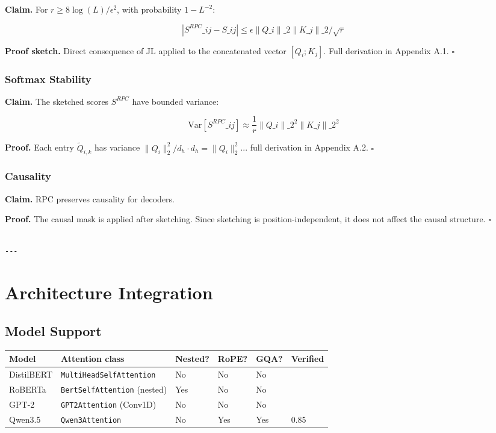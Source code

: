 \textbf{Claim.} For $r \geq 8 \log(L) / \epsilon^2$, with probability $1 - L^{-2}$:

\[
|S^{RPC}\_{ij} - S\_{ij}| \leq \epsilon \|Q\_i\|\_2 \|K\_j\|\_2 / \sqrt{r}
\tag{4.7}
\]

\textbf{Proof sketch.} Direct consequence of JL applied to the concatenated 
vector $[Q_i; K_j]$. Full derivation in Appendix A.1. $\square$

\subsubsection{Softmax Stability}

\textbf{Claim.} The sketched scores $S^{RPC}$ have bounded variance:

\[
\text{Var}[S^{RPC}\_{ij}] \approx \frac{1}{r} \|Q\_i\|\_2^2 \|K\_j\|\_2^2
\tag{4.8}
\]

\textbf{Proof.} Each entry $\tilde{Q}_{i,k}$ has variance $\|Q_i\|_2^2 / d_h \cdot d_h = \|Q_i\|_2^2$... 
full derivation in Appendix A.2. $\square$

\subsubsection{Causality}

\textbf{Claim.} RPC preserves causality for decoders.

\textbf{Proof.} The causal mask is applied after sketching. Since sketching is 
position-independent, it does not affect the causal structure. $\square$
\begin{lstlisting}

---
\end{lstlisting}


\section{Architecture Integration}

\subsection{Model Support}

\begin{table}[H]
\centering
\small
\begin{tabular}{llllll}
\toprule
\textbf{Model} & \textbf{Attention class} & \textbf{Nested?} & \textbf{RoPE?} & \textbf{GQA?} & \textbf{Verified} \\
\midrule
DistilBERT & \texttt{MultiHeadSelfAttention} & No & No & No &  \\
RoBERTa & \texttt{BertSelfAttention} (nested) & Yes & No & No &  \\
GPT-2 & \texttt{GPT2Attention} (Conv1D) & No & No & No &  \\
Qwen3.5 & \texttt{Qwen3Attention} & No & Yes & Yes & 0.85 \\
\bottomrule
\end{tabular}
\end{table}

